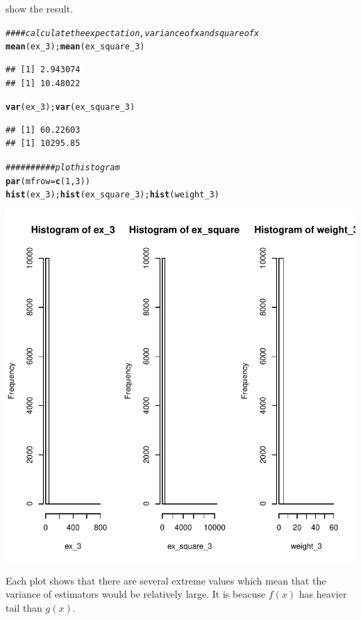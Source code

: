 \documentclass{article}\usepackage[]{graphicx}\usepackage[]{color}
\makeatletter
\def\maxwidth{ %
  \ifdim\Gin@nat@width>\linewidth
    \linewidth
  \else
    \Gin@nat@width
  \fi
}
\newcommand{\hlnum}[1]{\textcolor[rgb]{0.686,0.059,0.569}{#1}}%
\newcommand{\hlcom}[1]{\textcolor[rgb]{0.678,0.584,0.686}{\textit{#1}}}%
\newcommand{\hlstd}[1]{\textcolor[rgb]{0.345,0.345,0.345}{#1}}%
\newcommand{\hlkwc}[1]{\textcolor[rgb]{0.333,0.667,0.333}{#1}}%
\newcommand{\hlkwd}[1]{\textcolor[rgb]{0.737,0.353,0.396}{\textbf{#1}}}%
\newenvironment{kframe}{%
 \def\at@end@of@kframe{}%
 \ifinner\ifhmode%
  \def\at@end@of@kframe{\end{minipage}}%
  \begin{minipage}{\columnwidth}%
 \fi\fi%
 \def\FrameCommand##1{\hskip\@totalleftmargin \hskip-\fboxsep
 \colorbox{shadecolor}{##1}\hskip-\fboxsep
     \hskip-\linewidth \hskip-\@totalleftmargin \hskip\columnwidth}%
 \MakeFramed {\advance\hsize-\width
   \@totalleftmargin\z@ \linewidth\hsize
   \@setminipage}}%
 {\par\unskip\endMakeFramed%
 \at@end@of@kframe}
\newenvironment{knitrout}{}{} %
\makeatother
\begin{document}
show the result.
\begin{knitrout}
\color{fgcolor}\begin{kframe}
\begin{alltt}
\hlcom{####calculate the expectation,variance of x and square of x}
\hlkwd{mean}\hlstd{(ex_3);}\hlkwd{mean}\hlstd{(ex_square_3)}
\end{alltt}
\begin{verbatim}
## [1] 2.943074
## [1] 10.48022
\end{verbatim}
\begin{alltt}
\hlkwd{var}\hlstd{(ex_3);}\hlkwd{var}\hlstd{(ex_square_3)}
\end{alltt}
\begin{verbatim}
## [1] 60.22603
## [1] 10295.85
\end{verbatim}
\begin{alltt}
\hlcom{##########plot histogram}
\hlkwd{par}\hlstd{(}\hlkwc{mfrow}\hlstd{=}\hlkwd{c}\hlstd{(}\hlnum{1}\hlstd{,}\hlnum{3}\hlstd{))}
\hlkwd{hist}\hlstd{(ex_3);}\hlkwd{hist}\hlstd{(ex_square_3);}\hlkwd{hist}\hlstd{(weight_3)}
\end{alltt}
\end{kframe}
\includegraphics[width=\maxwidth]{figure/r-chunk9-1} 

\end{knitrout}
Each plot shows that there are several extreme values which mean that the variance of estimators would be relatively large. It is beacuse $f(x)$ has heavier tail than $g(x)$.
\end{document}

